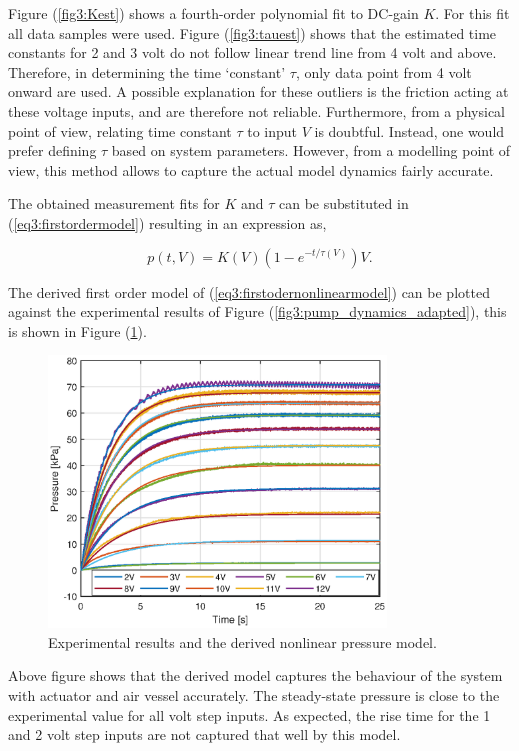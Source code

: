 Figure (\ref{fig3:Kest}) shows a fourth-order polynomial fit to DC-gain $K$. For this fit all data samples were used. Figure (\ref{fig3:tauest}) shows that the estimated time constants for 2 and 3 volt do not follow linear trend line from 4 volt and above. Therefore, in determining the time `constant' $\tau$, only data point from 4 volt onward are used. A possible explanation for these outliers is the friction acting at these voltage inputs, and are therefore not reliable. Furthermore, from a physical point of view, relating time constant $\tau$ to input $V$ is doubtful. Instead, one would prefer defining $\tau$ based on system parameters. However, from a modelling point of view, this method allows to capture the actual model dynamics fairly accurate.

The obtained measurement fits for $K$ and $\tau$ can be substituted in (\ref{eq3:firstordermodel}) resulting in an expression as,

\begin{equation}
    p(t,V) = K(V)(1-e^{-t/\tau(V)})V.
    \label{eq3:firstodernonlinearmodel}
    \end{equation}

The derived first order model of (\ref{eq3:firstodernonlinearmodel}) can be plotted against the experimental results of Figure (\ref{fig3:pump_dynamics_adapted}), this is shown in Figure (\ref{fig3:expvsfitpres}).

\begin{figure}[H]
    \centering
    \includegraphics[width = 0.8\textwidth]{Figures/Chapter3/expfit.eps}
    \caption{Experimental results and the derived nonlinear pressure model.}
    \label{fig3:expvsfitpres}
\end{figure}

Above figure shows that the derived model captures the behaviour of the system with actuator and air vessel accurately. The steady-state pressure is close to the experimental value for all volt step inputs. As expected, the rise time for the 1 and 2 volt step inputs are not captured that well by this model.
